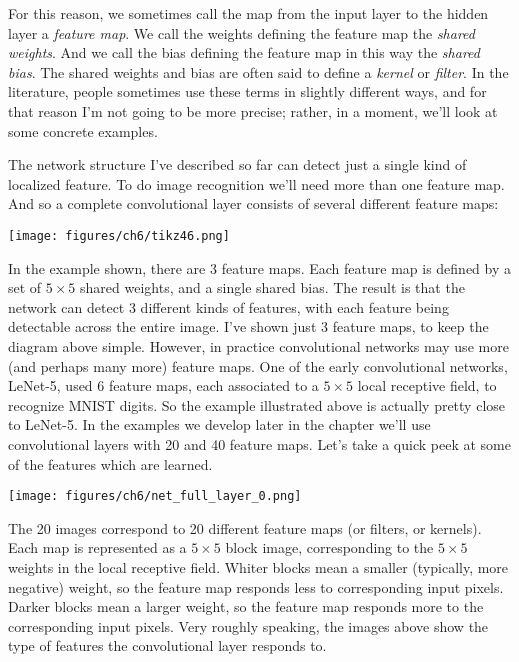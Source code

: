 \documentclass[a4paper,twoside,10pt]{book}
\begin{document}
For this reason, we sometimes call the map from the input layer to the hidden layer a \textit{feature map}. We call the weights defining the feature map the \textit{shared weights}. And we call the bias defining the feature map in this way the \textit{shared bias}. The shared weights and bias are often said to define a \textit{kernel} or \textit{filter}. In the literature, people sometimes use these terms in slightly different ways, and for that reason I'm not going to be more precise; rather, in a moment, we'll look at some concrete examples.

The network structure I've described so far can detect just a single kind of localized feature. To do image recognition we'll need more than one feature map. And so a complete convolutional layer consists of several different feature maps:
\begin{center}
	\texttt{[image: figures/ch6/tikz46.png]}
\end{center}
In the example shown, there are 3 feature maps. Each feature map is defined by a set of $5\times5$ shared weights, and a single shared bias. The result is that the network can detect 3 different kinds of features, with each feature being detectable across the entire image.
I've shown just 3 feature maps, to keep the diagram above simple. However, in practice convolutional networks may use more (and perhaps many more) feature maps. One of the early convolutional networks, LeNet-5, used 6 feature maps, each associated to a $5\times5$ local receptive field, to recognize MNIST digits. So the example illustrated above is actually pretty close to LeNet-5. In the examples we develop later in the chapter we'll use convolutional layers with 20 and 40 feature maps. Let's take a quick peek at some of the features which are learned.%
\begin{center}
	\texttt{[image: figures/ch6/net\_full\_layer\_0.png]}
\end{center}
The 20 images correspond to 20 different feature maps (or filters, or kernels). Each map is represented as a $5\times5$ block image, corresponding to the $5\times5$ weights in the local receptive field. Whiter blocks mean a smaller (typically, more negative) weight, so the feature map responds less to corresponding input pixels. Darker blocks mean a larger weight, so the feature map responds more to the corresponding input pixels. Very roughly speaking, the images above show the type of features the convolutional layer responds to.
\end{document}
